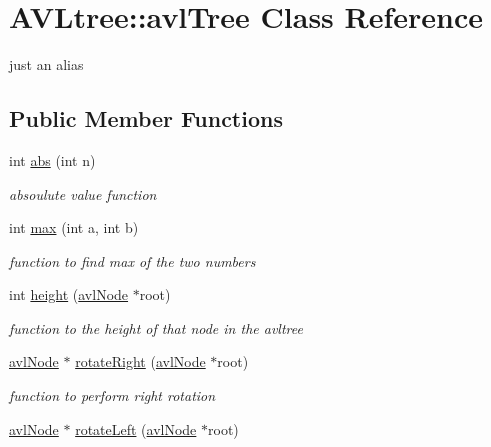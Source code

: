 \hypertarget{class_a_v_ltree_1_1avl_tree}{\section{A\-V\-Ltree\-:\-:avl\-Tree Class Reference}
\label{class_a_v_ltree_1_1avl_tree}
}


just an alias  


\subsection*{Public Member Functions}
\begin{DoxyCompactItemize}
\item 
int \hyperlink{class_a_v_ltree_1_1avl_tree_a9c4df0c7773c1fc6609f4caf65a9ec1a}{abs} (int n)
\begin{DoxyCompactList}\small\item\em absoulute value function \end{DoxyCompactList}\item 
int \hyperlink{class_a_v_ltree_1_1avl_tree_ac7d89b554575f1a278eb309ad082eb2c}{max} (int a, int b)
\begin{DoxyCompactList}\small\item\em function to find max of the two numbers \end{DoxyCompactList}\item 
int \hyperlink{class_a_v_ltree_1_1avl_tree_af4606787363b033b2fad7bad19417fee}{height} (\hyperlink{namespace_a_v_ltree_a563d9b152f0d58a69308eeec8d716882}{avl\-Node} $\ast$root)
\begin{DoxyCompactList}\small\item\em function to the height of that node in the avltree \end{DoxyCompactList}\item 
\hyperlink{namespace_a_v_ltree_a563d9b152f0d58a69308eeec8d716882}{avl\-Node} $\ast$ \hyperlink{class_a_v_ltree_1_1avl_tree_afb548bdf44cfbb208a3f8c5cda281f57}{rotate\-Right} (\hyperlink{namespace_a_v_ltree_a563d9b152f0d58a69308eeec8d716882}{avl\-Node} $\ast$root)
\begin{DoxyCompactList}\small\item\em function to perform right rotation \end{DoxyCompactList}\item 
\hyperlink{namespace_a_v_ltree_a563d9b152f0d58a69308eeec8d716882}{avl\-Node} $\ast$ \hyperlink{class_a_v_ltree_1_1avl_tree_a84087eaf028434969294246ce3a698ae}{rotate\-Left} (\hyperlink{namespace_a_v_ltree_a563d9b152f0d58a69308eeec8d716882}{avl\-Node} $\ast$root)

\end{DoxyCompactItemize}
